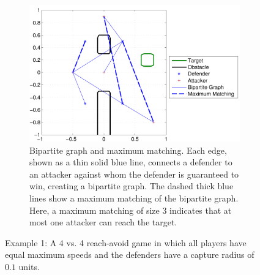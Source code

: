 \begin{figure}
	\ContinuedFloat
	\centering
	\begin{subfigure}{0.4\textwidth}
	\centering
	\includegraphics[width=\textwidth]{"fig/max matching 1"}
	\caption{Bipartite graph and maximum matching. Each edge, shown as a thin solid blue line, connects a defender to an attacker against whom the defender is guaranteed to win, creating a bipartite graph. The dashed thick blue lines show a maximum matching of the bipartite graph. Here, a maximum matching of size 3 indicates that at most one attacker can reach the target.}
	\label{subfig:max_matching_1}
	\end{subfigure}
	
\caption{Example 1: A 4 vs. 4 reach-avoid game in which all players have equal maximum speeds and the defenders have a capture radius of $0.1$ units.}
\label{fig:results1}
\end{figure}

